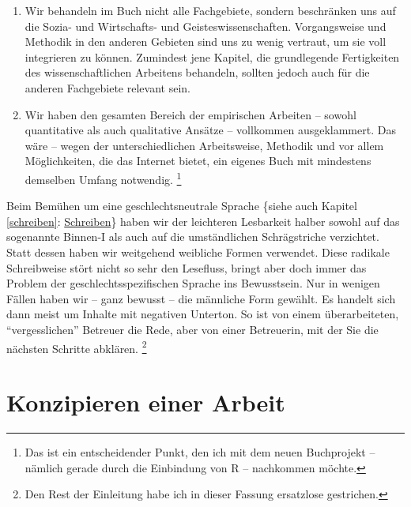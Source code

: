 \documentclass[]{book}
\providecommand{\tightlist}{%
  \setlength{\itemsep}{0pt}\setlength{\parskip}{0pt}}
\let\rmarkdownfootnote\footnote%
\def\footnote{\protect\rmarkdownfootnote}
\theoremstyle{definition}
\theoremstyle{definition}
\theoremstyle{definition}
\theoremstyle{remark}
\begin{document}
\begin{enumerate}
\def\labelenumi{\arabic{enumi}.}
\tightlist
\item
  Wir behandeln im Buch nicht alle Fachgebiete, sondern beschränken uns
  auf die Sozia- und Wirtschafts- und Geisteswissenschaften.
  Vorgangsweise und Methodik in den anderen Gebieten sind uns zu wenig
  vertraut, um sie voll integrieren zu können. Zumindest jene Kapitel,
  die grundlegende Fertigkeiten des wissenschaftlichen Arbeitens
  behandeln, sollten jedoch auch für die anderen Fachgebiete relevant
  sein.
\item
  Wir haben den gesamten Bereich der empirischen Arbeiten -- sowohl
  quantitative als auch qualitative Ansätze -- vollkommen ausgeklammert.
  Das wäre -- wegen der unterschiedlichen Arbeitsweise, Methodik und vor
  allem Möglichkeiten, die das Internet bietet, ein eigenes Buch mit
  mindestens demselben Umfang notwendig. \footnote{Das ist ein
    entscheidender Punkt, den ich mit dem neuen Buchprojekt -- nämlich
    gerade durch die Einbindung von R -- nachkommen möchte.}
\end{enumerate}

Beim Bemühen um eine geschlechtsneutrale Sprache \{siehe auch Kapitel
\ref{schreiben}: \protect\hyperlink{schreiben}{Schreiben}\} haben wir
der leichteren Lesbarkeit halber sowohl auf das sogenannte Binnen-I als
auch auf die umständlichen Schrägstriche verzichtet. Statt dessen haben
wir weitgehend weibliche Formen verwendet. Diese radikale Schreibweise
stört nicht so sehr den Lesefluss, bringt aber doch immer das Problem
der geschlechtsspezifischen Sprache ins Bewusstsein. Nur in wenigen
Fällen haben wir -- ganz bewusst -- die männliche Form gewählt. Es
handelt sich dann meist um Inhalte mit negativen Unterton. So ist von
einem überarbeiteten, ``vergesslichen'' Betreuer die Rede, aber von
einer Betreuerin, mit der Sie die nächsten Schritte abklären. \footnote{Den
  Rest der Einleitung habe ich in dieser Fassung ersatzlose gestrichen.}

\hypertarget{konzipieren}{\chapter{Konzipieren einer
Arbeit}\label{konzipieren}}
\end{document}
